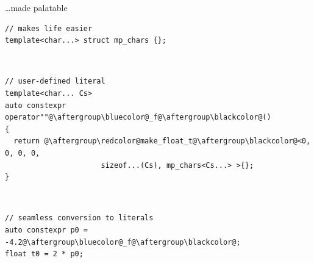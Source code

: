 \documentclass[xcolor=dvipsnames]{beamer}
\begin{document}
\begin{frame}[fragile]{\ldots made palatable}
\begin{lstlisting}
// makes life easier
template<char...> struct mp_chars {};
\end{lstlisting}

~

\begin{lstlisting}
// user-defined literal
template<char... Cs>
auto constexpr operator""@\aftergroup\bluecolor@_f@\aftergroup\blackcolor@()
{
  return @\aftergroup\redcolor@make_float_t@\aftergroup\blackcolor@<0, 0, 0, 0,
                      sizeof...(Cs), mp_chars<Cs...> >{};
}
\end{lstlisting}

~

\begin{lstlisting}
// seamless conversion to literals
auto constexpr p0 = -4.2@\aftergroup\bluecolor@_f@\aftergroup\blackcolor@;
float t0 = 2 * p0;
\end{lstlisting}
\end{frame}








\end{document}
